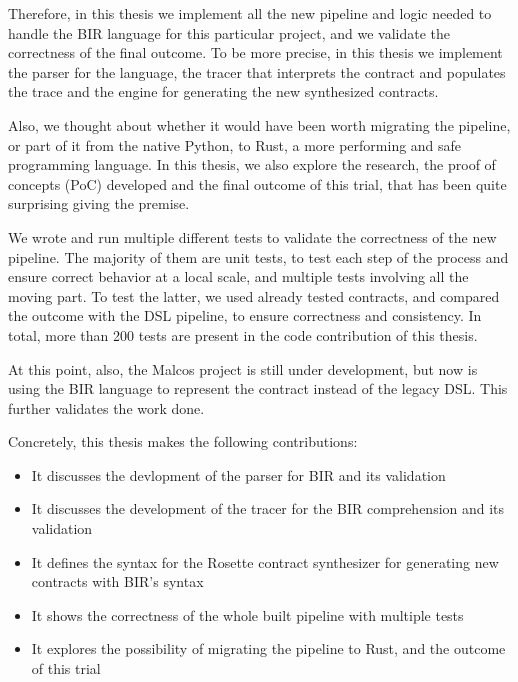 Therefore, in this thesis we implement all the new pipeline and logic needed to
handle the BIR language for this particular project, and we validate the correctness
of the final outcome. To be more precise, in this thesis we implement the parser
for the language, the tracer that interprets the contract and populates the
trace and the engine for generating the new synthesized contracts.

Also, we thought about whether it would have been worth migrating the pipeline,
or part of it from the native Python, to Rust, a more performing and safe
programming language. In this thesis, we also explore the research, the proof of
concepts (PoC) developed and the final outcome of this trial, that has been
quite surprising giving the premise.

We wrote and run multiple different tests to validate the correctness of the new
pipeline. The majority of them are unit tests, to test each step of the process
and ensure correct behavior at a local scale, and multiple tests involving all the
moving part. To test the latter, we used already tested contracts, and compared
the outcome with the DSL pipeline, to ensure correctness and consistency. In
total, more than 200 tests are present in the code contribution of this thesis.

At this point, also, the Malcos project is still under development, but now is
using the BIR language to represent the contract instead of the legacy DSL. This
further validates the work done.

Concretely, this thesis makes the following contributions:
\begin{itemize}
  \item It discusses the devlopment of the parser for BIR and its validation

  \item It discusses the development of the tracer for the BIR comprehension and
    its validation

  \item It defines the syntax for the Rosette contract synthesizer for generating
    new contracts with BIR's syntax

  \item It shows the correctness of the whole built pipeline with multiple tests

  \item It explores the possibility of migrating the pipeline to Rust, and the
    outcome of this trial
\end{itemize}

